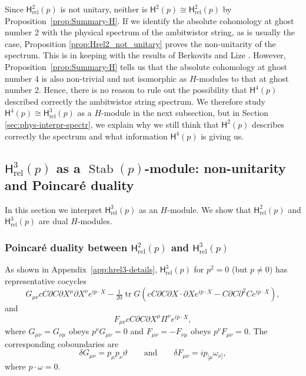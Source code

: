 \documentclass[11pt,reqno,a4paper,final]{amsart}
\theoremstyle{plain}
\theoremstyle{definition}
\renewcommand{\d}{\partial}
\newcommand{\sH}{\mathsf{H}}
\newcommand{\Hrel}{\mathsf{H}_{\mathrm{rel}}}
\newcommand{\Stab}{\operatorname{Stab}}
\newcommand{\tr}{\operatorname{tr}}
\newcommand{\1}{\mathbb{1}}
\numberwithin{equation}{section}
\begin{document}
Since $\Hrel^2(p)$ is not unitary, neither is $\sH^2(p) \cong
\Hrel^2(p)$ by Proposition~\ref{prop:Summary-H}. If we identify
the absolute cohomology at ghost number 2 with the physical spectrum
of the ambitwistor string, as is usually the case, Proposition
\ref{prop:Hrel2_not_unitary} proves the non-unitarity of the spectrum.
This is in keeping with the results of Berkovits and Lize
\cite{Berkovits:2018jvm}. However, Proposition~\ref{prop:Summary-H}
tells us that the absolute cohomology at ghost number 4 is also
non-trivial and not isomorphic as $H$-modules to that at ghost number
2. Hence, there is no reason to rule out the possibility that $\sH^4(p)$
described correctly the ambitwistor string spectrum.  We therefore
study $\sH^4(p) \cong \Hrel^3(p)$ as a $H$-module in the next
subsection, but in Section \ref{sec:phys-interpr-spectr}, we explain
why we still think that $\sH^2(p)$ describes correctly the spectrum
and what information $\sH^4(p)$ is giving us.

\subsection{$\Hrel^3(p)$ as a $\Stab(p)$-module: non-unitarity and
  Poincaré duality}
\label{sec:rep-theory-hrel3}

In this section we interpret $\Hrel^3(p)$ as an $H$-module.  We show
that $\Hrel^2(p)$ and $\Hrel^3(p)$ are dual $H$-modules.

\subsubsection{Poincaré duality between $\Hrel^2(p)$ and $\Hrel^3(p)$}
\label{sec:poinc-dual-betw}

As shown in Appendix~\ref{app:hrel3-details}, $\Hrel^3(p)$ for $p^2 =
0$ (but $p\neq 0$) has representative cocycles
\begin{equation}
  G_{\mu\nu} c C \d C \d X^\mu \d X^\nu e^{i p \cdot X} - \tfrac1{20} \tr
  G \left( c C \d C \d X \cdot \d X e^{i p\cdot X} - C \d C \d^2 C e^ {i p \cdot X}\right),
\end{equation}
and
\begin{equation}
  F_{\mu\nu} c C \d C \d X^\mu \Pi^\nu e^{i p \cdot X},
\end{equation}
where $G_{\mu\nu} = G_{\nu\mu}$ obeys $p^\nu G_{\mu\nu}= 0$ and
$F_{\mu\nu} = -F_{\nu\mu}$ obeys $p^\nu F_{\mu\nu} = 0$.  The
corresponding coboundaries are
\begin{equation}
  \delta G_{\mu\nu} = p_\mu p_\nu \vartheta \qquad\text{and}\qquad
  \delta F_{\mu\nu} = i p_{[\mu} \omega_{\nu]},
\end{equation}
where $p \cdot \omega = 0$.
\end{document}

